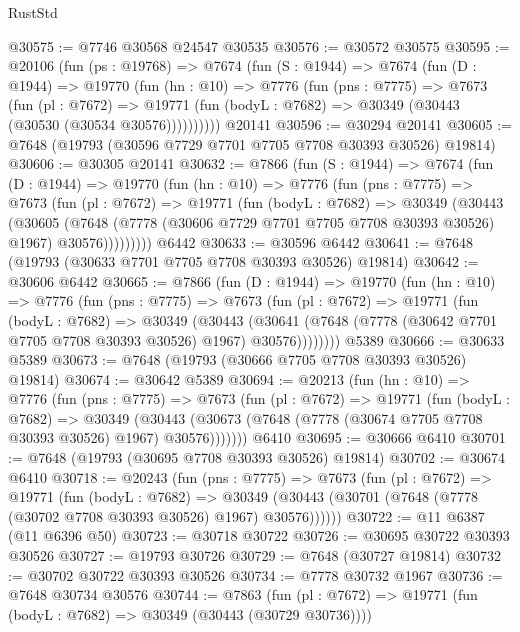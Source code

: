 \begin{lexlean}{RustStd}
\begin{coremodule}
@30575 := @7746 @30568 @24547 @30535
@30576 := @30572 @30575
@30595 := @20106
    (fun (ps : @19768) =>
    @7674
      (fun (S : @1944) =>
      @7674
        (fun (D : @1944) =>
        @19770
          (fun (hn : @10) =>
          @7776
            (fun (pns : @7775) =>
            @7673
              (fun (pl : @7672) =>
              @19771 (fun (bodyL : @7682) => @30349 (@30443 (@30530 (@30534 @30576))))))))))
    @20141
@30596 := @30294 @20141
@30605 := @7648 (@19793 (@30596 @7729 @7701 @7705 @7708 @30393 @30526) @19814)
@30606 := @30305 @20141
@30632 := @7866
    (fun (S : @1944) =>
    @7674
      (fun (D : @1944) =>
      @19770
        (fun (hn : @10) =>
        @7776
          (fun (pns : @7775) =>
          @7673
            (fun (pl : @7672) =>
            @19771
              (fun (bodyL : @7682) =>
              @30349
                (@30443
                  (@30605
                    (@7648
                      (@7778 (@30606 @7729 @7701 @7705 @7708 @30393 @30526) @1967)
                      @30576)))))))))
    @6442
@30633 := @30596 @6442
@30641 := @7648 (@19793 (@30633 @7701 @7705 @7708 @30393 @30526) @19814)
@30642 := @30606 @6442
@30665 := @7866
    (fun (D : @1944) =>
    @19770
      (fun (hn : @10) =>
      @7776
        (fun (pns : @7775) =>
        @7673
          (fun (pl : @7672) =>
          @19771
            (fun (bodyL : @7682) =>
            @30349
              (@30443
                (@30641 (@7648 (@7778 (@30642 @7701 @7705 @7708 @30393 @30526) @1967) @30576))))))))
    @5389
@30666 := @30633 @5389
@30673 := @7648 (@19793 (@30666 @7705 @7708 @30393 @30526) @19814)
@30674 := @30642 @5389
@30694 := @20213
    (fun (hn : @10) =>
    @7776
      (fun (pns : @7775) =>
      @7673
        (fun (pl : @7672) =>
        @19771
          (fun (bodyL : @7682) =>
          @30349
            (@30443 (@30673 (@7648 (@7778 (@30674 @7705 @7708 @30393 @30526) @1967) @30576)))))))
    @6410
@30695 := @30666 @6410
@30701 := @7648 (@19793 (@30695 @7708 @30393 @30526) @19814)
@30702 := @30674 @6410
@30718 := @20243
    (fun (pns : @7775) =>
    @7673
      (fun (pl : @7672) =>
      @19771
        (fun (bodyL : @7682) =>
        @30349 (@30443 (@30701 (@7648 (@7778 (@30702 @7708 @30393 @30526) @1967) @30576))))))
@30722 := @11 @6387 (@11 @6396 @50)
@30723 := @30718 @30722
@30726 := @30695 @30722 @30393 @30526
@30727 := @19793 @30726
@30729 := @7648 (@30727 @19814)
@30732 := @30702 @30722 @30393 @30526
@30734 := @7778 @30732 @1967
@30736 := @7648 @30734 @30576
@30744 := @7863
    (fun (pl : @7672) => @19771 (fun (bodyL : @7682) => @30349 (@30443 (@30729 @30736))))

\end{coremodule}
\end{lexlean}
